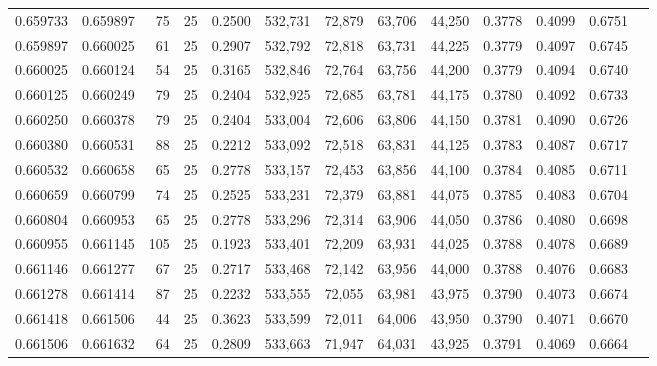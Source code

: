 \begin{tabular}{rrrrrrrrrrrrr}
0.659733 & 0.659897 &    75 &  25 &                                     0.2500 & 532,731 &  72,879 &  63,706 &  44,250 & 0.3778 & 0.4099 & 0.6751 \\
0.659897 & 0.660025 &    61 &  25 &                                     0.2907 & 532,792 &  72,818 &  63,731 &  44,225 & 0.3779 & 0.4097 & 0.6745 \\
0.660025 & 0.660124 &    54 &  25 &                                     0.3165 & 532,846 &  72,764 &  63,756 &  44,200 & 0.3779 & 0.4094 & 0.6740 \\
0.660125 & 0.660249 &    79 &  25 &                                     0.2404 & 532,925 &  72,685 &  63,781 &  44,175 & 0.3780 & 0.4092 & 0.6733 \\
0.660250 & 0.660378 &    79 &  25 &                                     0.2404 & 533,004 &  72,606 &  63,806 &  44,150 & 0.3781 & 0.4090 & 0.6726 \\
0.660380 & 0.660531 &    88 &  25 &                                     0.2212 & 533,092 &  72,518 &  63,831 &  44,125 & 0.3783 & 0.4087 & 0.6717 \\
0.660532 & 0.660658 &    65 &  25 &                                     0.2778 & 533,157 &  72,453 &  63,856 &  44,100 & 0.3784 & 0.4085 & 0.6711 \\
0.660659 & 0.660799 &    74 &  25 &                                     0.2525 & 533,231 &  72,379 &  63,881 &  44,075 & 0.3785 & 0.4083 & 0.6704 \\
0.660804 & 0.660953 &    65 &  25 &                                     0.2778 & 533,296 &  72,314 &  63,906 &  44,050 & 0.3786 & 0.4080 & 0.6698 \\
0.660955 & 0.661145 &   105 &  25 &                                     0.1923 & 533,401 &  72,209 &  63,931 &  44,025 & 0.3788 & 0.4078 & 0.6689 \\
0.661146 & 0.661277 &    67 &  25 &                                     0.2717 & 533,468 &  72,142 &  63,956 &  44,000 & 0.3788 & 0.4076 & 0.6683 \\
0.661278 & 0.661414 &    87 &  25 &                                     0.2232 & 533,555 &  72,055 &  63,981 &  43,975 & 0.3790 & 0.4073 & 0.6674 \\
0.661418 & 0.661506 &    44 &  25 &                                     0.3623 & 533,599 &  72,011 &  64,006 &  43,950 & 0.3790 & 0.4071 & 0.6670 \\
0.661506 & 0.661632 &    64 &  25 &                                     0.2809 & 533,663 &  71,947 &  64,031 &  43,925 & 0.3791 & 0.4069 & 0.6664 \\

\end{tabular}
